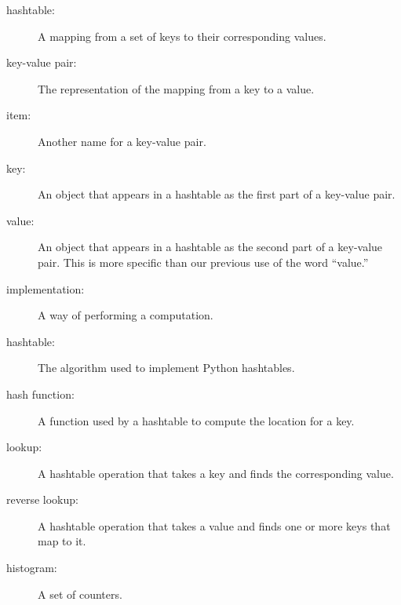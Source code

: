 \documentclass[10pt]{book}
\begin{document}
\begin{description}

\item[hashtable:] A mapping from a set of keys to their
corresponding values.

\item[key-value pair:] The representation of the mapping from
a key to a value.

\item[item:] Another name for a key-value pair.

\item[key:] An object that appears in a hashtable as the
first part of a key-value pair.

\item[value:] An object that appears in a hashtable as the
second part of a key-value pair.  This is more specific than
our previous use of the word ``value.''

\item[implementation:] A way of performing a computation.

\item[hashtable:] The algorithm used to implement Python
hashtables.

\item[hash function:] A function used by a hashtable to compute the
location for a key.
% 

\item[lookup:] A hashtable operation that takes a key and finds
the corresponding value.

\item[reverse lookup:] A hashtable operation that takes a value and finds
one or more keys that map to it.
% 
% 

\item[histogram:] A set of counters.


\end{description}
\end{document}
